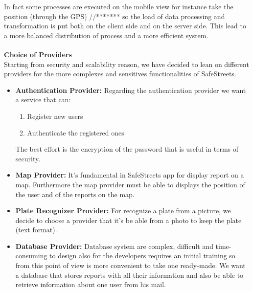 \documentclass[../RASD.tex]{subfiles}
\begin{document}
    In fact some processes are executed on the mobile view for instance take the position (through the GPS) //******* so the load of data processing
    and transformation is put both on the client side and on the server side.
    This lead to a more balanced distribution of process and a more efficient system.
    \\
    \\
    \textbf{Choice of Providers} \\
    Starting from security and scalability reason, we have decided to lean on different providers for the more complexes and sensitives functionalities of SafeStreets.
    \begin{itemize}
        \item \textbf{Authentication Provider:} Regarding the authentication provider we want a service that can: \begin{enumerate}
                                                                                                                     \item Register new users
                                                                                                                     \item Authenticate the registered ones
                                                                                                                 \end{enumerate}
        The best effort is the encryption of the password that is useful in terms of security.
        \item \textbf{Map Provider:} It's fundamental in SafeStreets app for display report on a map.
        Furthermore the map provider must be able to displays the position of the user and of the reports on the map.
        \item \textbf{Plate Recognizer Provider:} For recognize a plate from a picture, we decide to choose a provider that it’s be able from a photo
        to keep the plate (text format).
        \item \textbf{Database Provider:} Database system are complex, difficult and time-consuming to design also for the developers
        requires an initial training so from this point of view is more convenient to take one ready-made.
        We want a database that stores reports with all their information and also be able to retrieve information about one user from his mail.
    \end{itemize}
\end{document}
